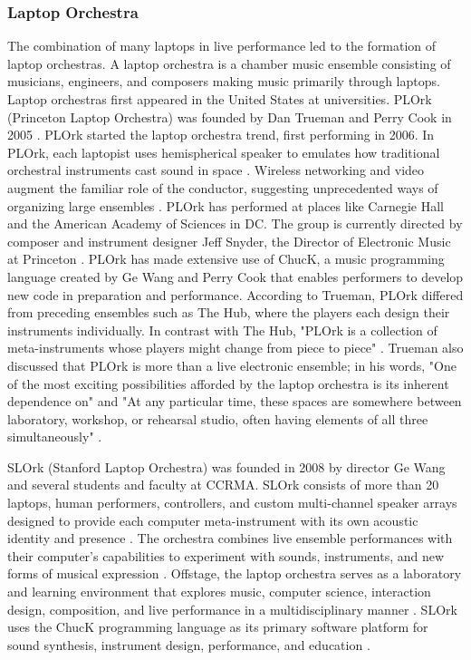 \documentclass[letterpaper, 12pt]{article}
\begin{document}
\subsubsection{Laptop Orchestra}


%
The combination of many laptops in live performance led to the formation of laptop orchestras.
%
A laptop orchestra is a chamber music ensemble consisting of musicians, engineers, and composers making music primarily through laptops.
%
Laptop orchestras first appeared in the United States at universities.
%
PLOrk (Princeton Laptop Orchestra) was founded by Dan Trueman and Perry Cook in 2005 \citep{snyder2022about}.
%
PLOrk started the laptop orchestra trend, first performing in 2006.
%
In PLOrk, each laptopist uses hemispherical speaker to emulates how traditional orchestral instruments cast sound in space \citep{snyder2022about}.
%
Wireless networking and video augment the familiar role of the conductor, suggesting unprecedented ways of organizing large ensembles \citep{snyder2022about}.
%
PLOrk has performed at places like Carnegie Hall and the American Academy of Sciences in DC.
%
The group is currently directed by composer and instrument designer Jeff Snyder, the Director of Electronic Music at Princeton \citep{snyder2022about}.
%
PLOrk has made extensive use of ChucK, a music programming language created by Ge Wang and Perry Cook that enables performers to develop new code in preparation and performance.
%
According to Trueman, PLOrk differed from preceding ensembles such as The Hub, where the players each design their instruments individually.
%
In contrast with The Hub, "PLOrk is a collection of meta-instruments whose players might change from piece to piece" \citep{trueman2007laptop}.
%
Trueman also discussed that PLOrk is more than a live electronic ensemble; in his words, "One of the most exciting possibilities afforded by the laptop orchestra is its inherent dependence on" and "At any particular time, these spaces are somewhere between laboratory, workshop, or rehearsal studio, often having elements of all three simultaneously" \citep{trueman2007laptop}.

%
SLOrk (Stanford Laptop Orchestra) was founded in 2008 by director Ge Wang and several students and faculty at CCRMA.
%
SLOrk consists of more than 20 laptops, human performers, controllers, and custom multi-channel speaker arrays designed to provide each computer meta-instrument with its own acoustic identity and presence \citep{slork2024about}.
%
The orchestra combines live ensemble performances with their computer’s capabilities to experiment with sounds, instruments, and new forms of musical expression \citep{slork2024about}.
%
Offstage, the laptop orchestra serves as a laboratory and learning environment that explores music, computer science, interaction design, composition, and live performance in a multidisciplinary manner \citep{slork2024about}.
%
SLOrk uses the ChucK programming language as its primary software platform for sound synthesis, instrument design, performance, and education \citep{slork2024about}.
\end{document}
